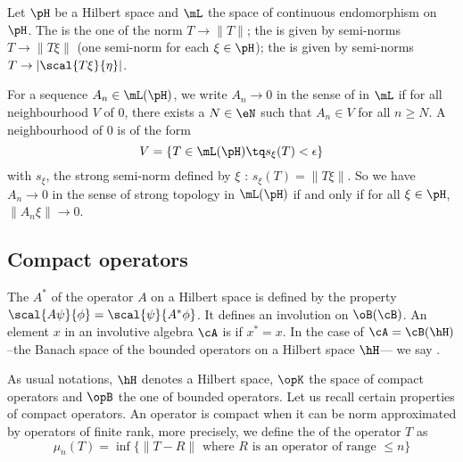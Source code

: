 Let $\pH$ be a Hilbert space and $\mL$ the space of continuous endomorphism on $\pH$. The  is the one of the norm $T\to\| T \|$; the  is given by semi-norms $T\to\| T\xi \|$ (one semi-norm for each $\xi\in\pH$); the  is given by semi-norms $T\to | \scal{ T\xi }{ \eta } |$.

For a sequence $A_n\in\mL(\pH)$, we write $A_n\to 0$ in the sense of  in $\mL$ if for all neighbourhood $V$ of $0$, there exists a $N\in\eN$ such that $A_n\in V$ for all $n\geq N$. A neighbourhood of $0$ is of the form
\[ 
  V=\{ T\in\mL(\pH)\tq s_{\xi}(T)<\epsilon \}
\]
with $s_{\xi}$, the strong semi-norm defined by $\xi$ : $s_{\xi}(T)=\| T\xi \|$. So we have $A_n\to 0$ in the sense of strong topology in $\mL(\pH)$ if and only if for all $\xi\in\pH$, $\| A_n\xi \|\to 0$.

\subsection{Compact operators}




\begin{definition}
The  $A^*$ of the operator $A$ on a Hilbert space is defined by the property $\scal{A\psi}{\phi}=\scal{\psi}{A^*\phi}$. It defines an involution on $\oB(\cB)$.  An element $x$ in an involutive algebra $\cA$ is  if $x^*=x$. In the case of $\cA=\cB(\hH)$ --the Banach space of the bounded operators on a Hilbert space $\hH$--- we say .
\end{definition}

As usual notations, $\hH$ denotes a Hilbert space, $\opK$ the space of compact operators and $\opB$ the one of bounded operators. Let us recall certain properties of compact operators.  An operator is compact when it can be norm approximated by operators of finite rank, more precisely, we define the  of the operator $T$ as
\begin{equation}	\label{Defmuncaharacinfn}
  \mu_n(T)=\inf\{ \| T-R \| \textrm{ where $R$ is an operator of range $\leq n$} \}
\end{equation}

